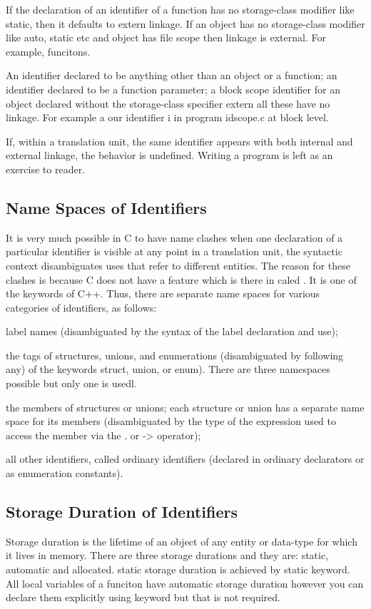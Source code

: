If the declaration of an identifier of a function has no storage-class
modifier like static, then it defaults to extern linkage. If an
object has no storage-class modifier like auto, static etc and object
has file scope then linkage is external. For example, funcitons.

An identifier declared to be anything other than an object or a
function; an identifier declared to be a function parameter; a block
scope identifier for an object declared without the storage-class
specifier extern all these have no linkage. For example a our
identifier i in program idscope.c at block level.

If, within a translation unit, the same identifier appears with both
internal and external linkage, the behavior is undefined. Writing a
program is left as an exercise to reader.

\subsection{Name Spaces of Identifiers}
It is very much possible in C to have name clashes when one
declaration of a particular identifier is visible at any point in a
translation unit, the syntactic context disambiguates 
uses that refer to different entities. The reason for these clashes is
because C does not have a feature which is there in caled
. It is one of the keywords of C++. Thus, there are
separate name spaces for various categories of identifiers, as follows: 
\startitemize[n]
\item label names (disambiguated by the syntax of the label
  declaration and use); 
\item the tags of structures, unions, and enumerations (disambiguated by following any)
  of the keywords struct, union, or enum). There are three namespaces
  possible but only one is usedl.
\item the members of structures or unions; each structure or union has a separate name
  space for its members (disambiguated by the type of the expression used to access the
  member via the . or -> operator);
\item all other identifiers, called ordinary identifiers (declared in ordinary declarators or as
  enumeration constants).
\stopitemize

\subsection{Storage Duration of Identifiers}
Storage duration is the lifetime of an object of any entity or
data-type for which it lives in memory. There are three storage
durations and they are: static, automatic and allocated. static
storage duration is achieved by static keyword. All local variables of
a funciton have automatic storage duration however you can declare
them explicitly using keyword  but that is not required.

